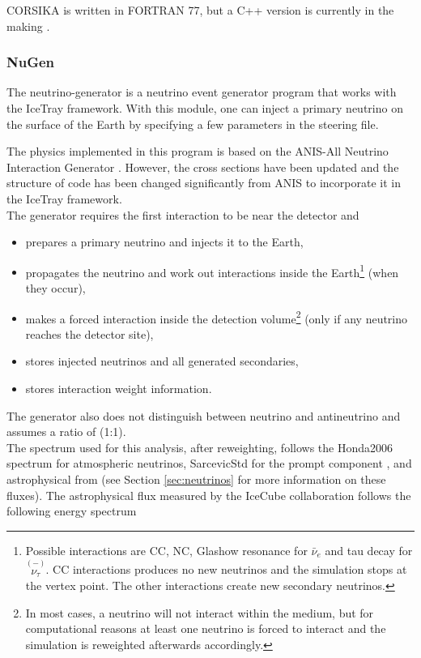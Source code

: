\noindent CORSIKA  is written in FORTRAN 77, but a C++ version is currently in the making \cite{Engel:2018akg}.
\subsubsection{NuGen}
The neutrino-generator  is a neutrino event generator program that works with the IceTray framework. With this module, one can inject a primary neutrino on the surface of the Earth by specifying a few parameters in the steering file.

The physics implemented in this program is based on the ANIS-All Neutrino Interaction Generator \cite{Gazizov:2004va}. However, the cross sections have been updated and the structure of code has been changed significantly from ANIS to incorporate it in the IceTray framework.\\

\noindent The generator requires the first interaction to be near the detector and

\newcommand\barparen[1]{\overset{(-)}{#1}}

\begin{itemize}
\item prepares a primary neutrino and injects it to the Earth,
\item propagates the neutrino and work out interactions inside the Earth\footnote{Possible interactions are CC, NC, Glashow resonance for $\bar{\nu}_e$ and tau decay for $\barparen{\nu_\tau}$. CC interactions produces no new neutrinos and the simulation stops at the vertex point. The other interactions create new secondary neutrinos.} (when they occur),
\item makes a forced interaction inside the detection volume\footnote{
In most cases, a neutrino will not interact within the medium, but for computational reasons at least one neutrino is forced to interact and the simulation is reweighted afterwards accordingly.} (only if any neutrino reaches the detector site),
\item stores injected neutrinos and all generated secondaries,
\item stores interaction weight information.
\end{itemize}
\vspace{3mm}
\noindent The generator also does not distinguish between neutrino and antineutrino and assumes a ratio of (1:1).\\

\noindent The spectrum used for this analysis, after reweighting, follows the Honda2006 spectrum \cite{Honda:2006qj} for atmospheric neutrinos, SarcevicStd for the prompt component \cite{Enberg:2008te}, and astrophysical from \cite{Aartsen:2014gkd} (see Section \ref{sec:neutrinos} for more information on these fluxes). The astrophysical flux measured by the IceCube collaboration follows the following energy spectrum

